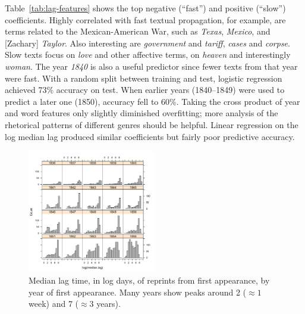\documentclass[pdftex,11pt]{article}
\begin{document}
Table~\ref{tab:lag-features} shows the top negative (``fast'') and
positive (``slow'') coefficients.  Highly correlated with fast textual
propagation, for example, are terms related to the Mexican-American
War, such as \emph{Texas}, \emph{Mexico}, and [Zachary] \emph{Taylor}.
Also interesting are \emph{government} and \emph{tariff}, \emph{cases}
and \emph{corpse}.  Slow texts focus on \emph{love} and other
affective terms, on \emph{heaven} and interestingly \emph{woman}.  The
year \emph{1840} is also a useful predictor since fewer texts from
that year were fast.  With a random split between training and test,
logistic regression achieved 73\% accuracy on test.  When earlier
years (1840--1849) were used to predict a later one (1850), accuracy
fell to 60\%.  Taking the cross product of year and word features only
slightly diminished overfitting; more analysis of the rhetorical
patterns of different genres should be helpful.  Linear regression on
the log median lag produced similar coefficients but fairly poor
predictive accuracy.

\begin{figure}
  \centering
  \includegraphics[width=0.5\textwidth]{lag-year}
  \caption{Median lag time, in log days, of reprints
    from first appearance, by year of first appearance.  Many years
    show peaks around 2 ($\approx 1$ week) and 7 ($\approx 3$ years).}
  \label{fig:lag-year}
\end{figure}
\end{document}
